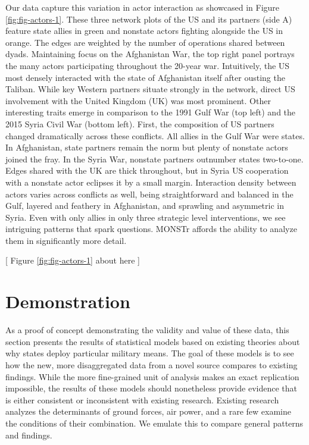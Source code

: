 \documentclass[fleqn,12pt]{article}
\begin{document}
Our data capture this variation in actor interaction as showcased in Figure \ref{fig:fig-actors-1}. These three network plots of the US and its partners (side A) feature state allies in green and nonstate actors fighting alongside the US in orange. The edges are weighted by the number of operations shared between dyads. Maintaining focus on the Afghanistan War, the top right panel portrays the many actors participating throughout the 20-year war. Intuitively, the US most densely interacted with the state of Afghanistan itself after ousting the Taliban. While key Western partners situate strongly in the network, direct US involvement with the United Kingdom (UK) was most prominent. Other interesting traits emerge in comparison to the 1991 Gulf War (top left) and the 2015 Syria Civil War (bottom left). First, the composition of US partners changed dramatically across these conflicts. All allies in the Gulf War were states. In Afghanistan, state partners remain the norm but plenty of nonstate actors joined the fray. In the Syria War, nonstate partners outnumber states two-to-one. Edges shared with the UK are thick throughout, but in Syria US cooperation with a nonstate actor eclipses it by a small margin. Interaction density between actors varies across conflicts as well, being straightforward and balanced in the Gulf, layered and feathery in Afghanistan, and sprawling and asymmetric in Syria. Even with only allies in only three strategic level interventions, we see intriguing patterns that spark questions. MONSTr affords the ability to analyze them in significantly more detail.

\begin{center}
	[ Figure \ref{fig:fig-actors-1} about here ]    
\end{center}

\section*{Demonstration}
As a proof of concept demonstrating the validity and value of these data, this section presents the results of statistical models based on existing theories about why states deploy particular military means. The goal of these models is to see how the new, more disaggregated data from a novel source compares to existing findings. While the more fine-grained unit of analysis makes an exact replication impossible, the results of these models should nonetheless provide evidence that is either consistent or inconsistent with existing research. Existing research analyzes the determinants of ground forces, air power, and a rare few examine the conditions of their combination. We emulate this to compare general patterns and findings. 
\end{document}
